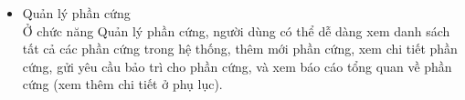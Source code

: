 \begin{itemize}
\item{Quản lý phần cứng}\\
Ở chức năng Quản lý phần cứng, người dùng có thể dễ dàng xem danh sách tất cả các phần cứng trong hệ thống, thêm mới phần cứng, xem chi tiết phần cứng, gửi yêu cầu bảo trì cho phần cứng, và xem báo cáo tổng quan về phần cứng (xem thêm chi tiết ở phụ lục).

\end{itemize}
